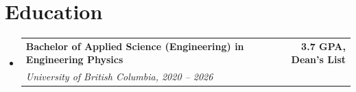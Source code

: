 \documentclass[letterpaper,11pt]{article}
\makeatletter
\newcommand{\resumeSubheading}[4]{
  \vspace{-2pt}\item
    \begin{tabular*}{0.97\textwidth}[t]{l@{\extracolsep{\fill}}r}
      \textbf{#1} & #2 \\
      \textit{\small#3} & \textit{\small #4} \\
    \end{tabular*}\vspace{-7pt}
}
\newcommand{\resumeSubHeadingListStart}{\begin{itemize}[leftmargin=0in, label={}]}
\newcommand{\resumeSubHeadingListEnd}{\end{itemize}}
\makeatother
\begin{document}
\vspace{-8mm}

\section{Education}
  \resumeSubHeadingListStart
    \resumeSubheading
      {Bachelor of Applied Science (Engineering) in Engineering Physics}{\textbf{3.7 GPA, Dean's List}}
      {University of British Columbia, 2020 -- 2026}{}
  \resumeSubHeadingListEnd

\vspace{-3mm}
\end{document}
